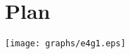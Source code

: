 \documentclass[a4paper,11pt]{article}
\begin{document}


\section{Plan}


\texttt{[image: graphs/e4g1.eps]}
\end{document}
